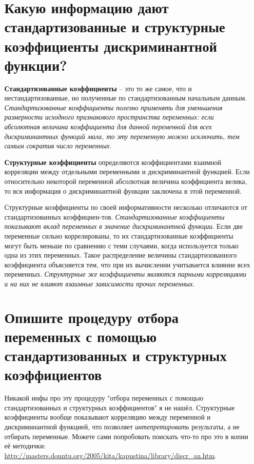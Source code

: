 \documentclass[a4paper, 12pt]{article}
\begin{document}
\section{Какую информацию дают стандартизованные и структурные коэффициенты дискриминантной функции?}
 \textbf{Стандартизованные коэффициенты}  -- это то же самое, что и нестандартизованные, но полученные по стандартизованным начальным данным. \textit{Стандартизованные коэффициенты полезно применять для уменьшения размерности исходного признакового пространства переменных: если абсолютная величина коэффициента для данной переменной для всех дискриминантных функций мала, то эту переменную можно исключить, тем самым сократив число переменных.} 

\textbf{Структурные коэффициенты}  определяются коэффициентами взаимной корреляции между отдельными переменными и дискриминантной функцией. Если относительно некоторой переменной абсолютная величина коэффициента велика, то вся информация о дискриминантной функции заключена в этой переменной. 

Структурные коэффициенты по своей информативности несколько отличаются от стандартизованных коэффициен-тов. \textit{Стандартизованные коэффициенты показывают вклад переменных в значение дискриминантной функции}. Если две переменные сильно коррелированы, то их стандартизованные коэффициенты могут быть меньше по сравнению с теми случаями, когда используется только одна из этих переменных. Такое распределение величины стандартизованного коэффициента объясняется тем, что при их вычислении учитывается влияние всех переменных. \textit{Структурные же коэффициенты являются парными корреляциями и на них не влияют взаимные зависимости прочих переменных}.

\section{Опишите процедуру отбора переменных с помощью стандартизованных и структурных коэффициентов}
Никакой инфы про эту процедуру "отбора переменных с помощью стандартизованных и структурных коэффициентов" я не нашёл. Структурные коэффициенты вообще показывают корреляцию между переменной и дискриминантной функцией, что позволяет {\it интепретировать} результаты, а не отбирать переменные. Можете сами попробовать поискать что-то про это в копии её методички: \url{http://masters.donntu.org/2005/kita/kapustina/library/discr_an.htm}.
\end{document}
